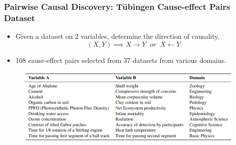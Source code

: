 \documentclass{beamer}
\begin{document}
\begin{frame}
	\frametitle{Pairwise Causal Discovery: T\"{u}bingen Cause-effect Pairs Dataset}
	\begin{itemize}
		\item Given a dataset on $ 2 $ variables, determine the direction of causality.
			$$ (X, Y) \implies X \rightarrow Y \;\; \textit{or} \; \; X \leftarrow Y $$
		\item 108 cause-effect pairs selected from 37 datasets from
			various domains.
	\end{itemize}
	\begin{figure}
		\centering
		\includegraphics[scale=0.45]{imgs/table1.png}
	\end{figure}
\end{frame}
\end{document}

